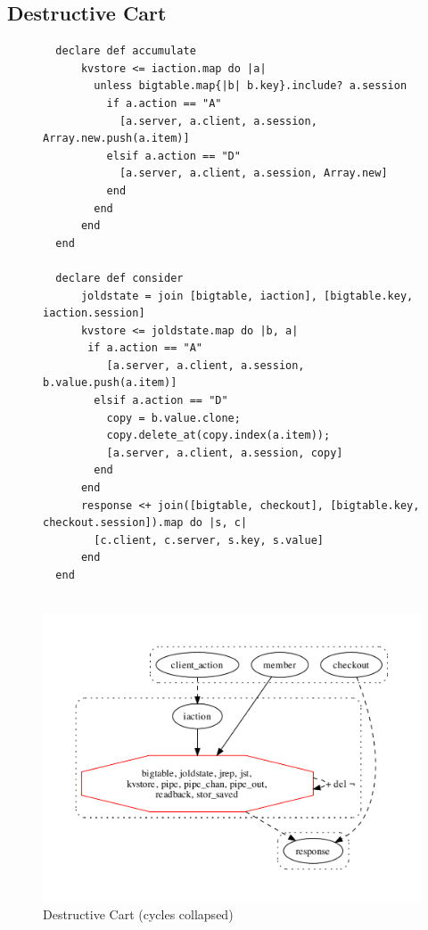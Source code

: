 \subsection{Destructive Cart}

\begin{figure}[t]
\begin{tiny}
\begin{verbatim}
  declare def accumulate
      kvstore <= iaction.map do |a| 
        unless bigtable.map{|b| b.key}.include? a.session
          if a.action == "A"
            [a.server, a.client, a.session, Array.new.push(a.item)]
          elsif a.action == "D"
            [a.server, a.client, a.session, Array.new]
          end
        end
      end
  end

  declare def consider
      joldstate = join [bigtable, iaction], [bigtable.key, iaction.session]
      kvstore <= joldstate.map do |b, a| 
       if a.action == "A"
          [a.server, a.client, a.session, b.value.push(a.item)]
        elsif a.action == "D"
          copy = b.value.clone;
          copy.delete_at(copy.index(a.item));
          [a.server, a.client, a.session, copy]
        end
      end
      response <+ join([bigtable, checkout], [bigtable.key, checkout.session]).map do |s, c|
        [c.client, c.server, s.key, s.value]
      end
  end


\end{verbatim}
\end{tiny}
\centering
\includegraphics[width=0.9\linewidth]{fig/ImperativeCartServer_gvoutput.pdf}

\caption{Destructive Cart (cycles collapsed)}
\label{fig:pdg-destructive}
\end{figure}

